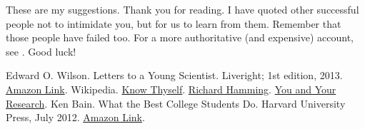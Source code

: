 \documentclass[a6paper]{article}
\begin{document}
These are my suggestions. Thank you for reading. I have quoted other successful people not to intimidate you, but for us to learn from them. Remember that those people have failed too. For a more authoritative (and expensive) account, see \cite{ken-bain}. Good luck!

\begin{thebibliography}{00}
     Edward O. Wilson. Letters to a Young Scientist. Liveright; 1st edition, 2013. \href{https://www.amazon.in/Letters-Young-Scientist-Edward-Wilson-ebook/dp/B00AR3551Y}{Amazon Link}.
     Wikipedia. \href{https://en.wikipedia.org/wiki/Know_thyself}{Know Thyself}.
     \href{https://en.wikipedia.org/wiki/Richard_Hamming}{Richard Hamming}. \href{https://www.cs.virginia.edu/~robins/YouAndYourResearch.html}{You and Your Research}.
     Ken Bain. What the Best College Students Do. Harvard University Press, July 2012. \href{https://www.amazon.in/What-Best-College-Students-Do-ebook/dp/B008L42UJ6}{Amazon Link}.
\end{thebibliography}
\end{document}
